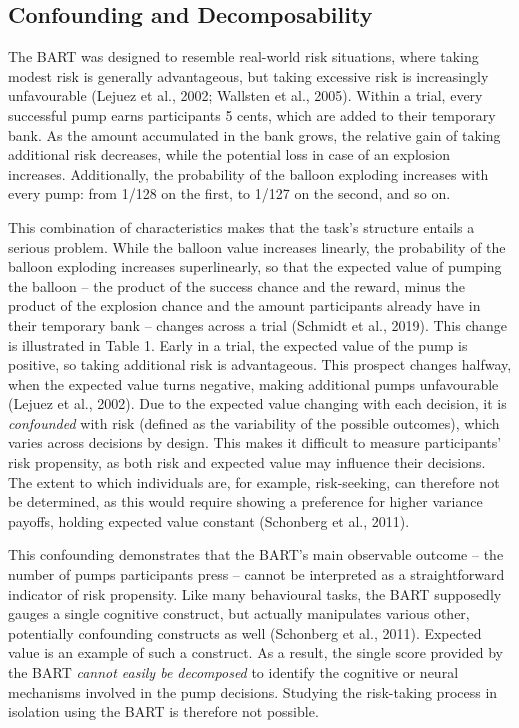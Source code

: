\documentclass[serif, twocolumn, review]{jote-article}
\begin{document}
{}
\subsection*{Confounding and Decomposability}
\gotoreview
\label{sec:confounding}


 The BART was designed to resemble real-world risk situations, where taking modest risk is generally advantageous, but taking excessive risk is increasingly unfavourable (Lejuez et al., 2002; Wallsten et al., 2005). Within a trial, every successful pump earns participants 5 cents, which are added to their temporary bank. As the amount accumulated in the bank grows, the relative gain of taking additional risk decreases, while the potential loss in case of an explosion increases. Additionally, the probability of the balloon exploding increases with every pump: from 1/128 on the first, to 1/127 on the second, and so on.

\label{sec:confoundingp2}
This combination of characteristics makes that the task's structure entails a serious problem. While the balloon value increases linearly, the probability of the balloon exploding increases superlinearly, so that the expected value of pumping the balloon -- the product of the success chance and the reward, minus the product of the explosion chance and the amount participants already have in their temporary bank -- changes across a trial (Schmidt et al., 2019). This change is illustrated in Table 1. Early in a trial, the expected value of the pump is positive, so taking additional risk is advantageous. This prospect changes halfway, when the expected value turns negative, making additional pumps unfavourable (Lejuez et al., 2002). Due to the expected value changing with each decision, it is \textit{confounded} with risk (defined as the variability of the possible outcomes), which varies across decisions by design. This makes it difficult to measure participants' risk propensity, as both risk and expected value may influence their decisions. The extent to which individuals are, for example, risk-seeking, can therefore not be determined, as this would require showing a preference for higher variance payoffs, holding expected value constant (Schonberg et al., 2011).

This confounding demonstrates that the BART's main observable outcome -- the number of pumps participants press -- cannot be interpreted as a straightforward indicator of risk propensity. Like many behavioural tasks, the BART supposedly gauges a single cognitive construct, but actually manipulates various other, potentially confounding constructs as well (Schonberg et al., 2011). Expected value is an example of such a construct. As a result, the single score provided by the BART \textit{cannot easily be decomposed} to identify the cognitive or neural mechanisms involved in the pump decisions. Studying the risk-taking process in isolation using the BART is therefore not possible.
\end{document}
